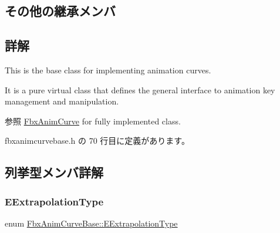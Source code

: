 \subsection*{その他の継承メンバ}


\subsection{詳解}
This is the base class for implementing animation curves.

It is a pure virtual class that defines the general interface to animation key management and manipulation.

\begin{DoxySeeAlso}{参照}
\hyperlink{class_fbx_anim_curve}{Fbx\+Anim\+Curve} for fully implemented class. 
\end{DoxySeeAlso}


 fbxanimcurvebase.\+h の 70 行目に定義があります。



\subsection{列挙型メンバ詳解}
\mbox{\label{class_fbx_anim_curve_base_aa7214d43daa7b6b9b47a8118a858847f}} 
\subsubsection{\texorpdfstring{E\+Extrapolation\+Type}{EExtrapolationType}}
{\footnotesize\ttfamily enum \hyperlink{class_fbx_anim_curve_base_aa7214d43daa7b6b9b47a8118a858847f}{Fbx\+Anim\+Curve\+Base\+::\+E\+Extrapolation\+Type}}

